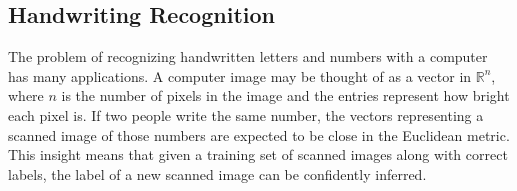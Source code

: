 \subsection*{Handwriting Recognition} %

The problem of recognizing handwritten letters and numbers with a computer has many applications.
A computer image may be thought of as a vector in $\mathbb{R}^n$, where $n$ is the number of pixels in the image and the entries represent how bright each pixel is.
If two people write the same number, the vectors representing a scanned image of those numbers are expected to be close in the Euclidean metric.
This insight means that given a training set of scanned images along with correct labels, the label of a new scanned image can be confidently inferred.

